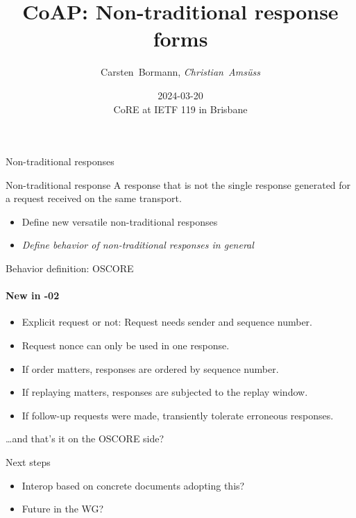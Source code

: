 

\title{CoAP: Non-traditional response forms}
\subtitle{}
\author{Carsten~Bormann, \textit{Christian~Amsüss}}
\date{2024-03-20 \\CoRE at IETF 119 in Brisbane}



\frame{\titlepage}

\begin{frame}{Non-traditional responses}\Large
    \begin{block}{Non-traditional response}
    A response that is not the single response
    generated for a request received on the same transport.
    \end{block}

    \begin{itemize}
        \item Define new versatile non-traditional responses
        \item \textit{Define behavior of non-traditional responses in general}
    \end{itemize}
\end{frame}

\begin{frame}{Behavior definition: OSCORE}\Large
    \framesubtitle{New in -02}

    \begin{itemize}
        \item Explicit request or not: Request needs sender and sequence number.
        \item Request nonce can only be used in one response.
        \item If order matters, responses are ordered by sequence number.
        \item If replaying matters, responses are subjected to the replay window.
        \item If follow-up requests were made, transiently tolerate erroneous responses.
    \end{itemize}

    \bigskip

    \ldots and that's it on the OSCORE side?
\end{frame}

\begin{frame}{Next steps}\Large
    \begin{itemize}
        \item Interop based on concrete documents adopting this?
        \item Future in the WG?
    \end{itemize}
\end{frame}

